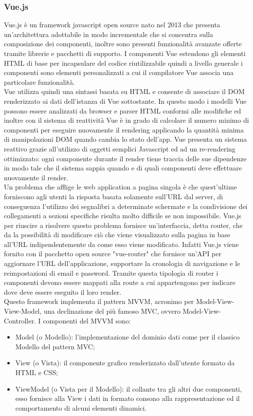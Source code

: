 \subsubsection*{Vue.js}
Vue.js è un framework javascript open source nato nel 2013 che presenta un'architettura adottabile in modo incrementale che si concentra sulla composizione dei componenti, inoltre sono presenti funzionalità avanzate offerte tramite librerie e pacchetti di supporto. I componenti Vue estendono gli elementi HTML di base per incapsulare del codice riutilizzabile quindi a livello generale i componenti sono elementi personalizzati a cui il compilatore Vue associa una particolare funzionalità.\\
Vue utilizza quindi una sintassi basata su HTML e consente di associare il DOM renderizzato ai dati dell'istanza di Vue sottostante. In questo modo i modelli Vue possono essere analizzati da browser e parser HTML conformi alle modifiche ed inoltre con il sistema di reattività Vue è in grado di calcolare il numero minimo di componenti per eseguire nuovamente il rendering applicando la quantità minima di manipolazioni DOM quando cambia lo stato dell'app. Vue presenta un sistema reattivo grazie all'utilizzo di oggetti semplici Javascript ed ad un re-rendering ottimizzato: ogni componente durante il render tiene traccia delle sue dipendenze in modo tale che il sistema sappia quando e di quali componenti deve effettuare nuovamente il render.\\
Un problema che afflige le web application a pagina singola è che quest'ultime forniscono agli utenti la risposta basata solamente sull'URL dal server, di conseguenza l'utilizzo dei segnalibri a determinate schermate e la condivisione dei collegamenti a sezioni specifiche risulta molto difficile se non impossibile. Vue.js per riuscire a risolvere questo problema fornisce un'interfaccia, detta router, che da la possibilità di modificare ciò che viene visualizzato sulla pagina in base all'URL indipendentemente da come esso viene modificato. Infatti Vue.js viene fornito con il pacchetto open source "vue-router" che fornisce un'API per aggiornare l'URL dell'applicazione, supportare la cronologia di navigazione e le reimpostazioni di email e password. Tramite questa tipologia di router i componenti devono essere mappati alla route a cui appartengono per indicare dove deve essere eseguito il loro render.\\
Questo framework implementa il pattern MVVM, acronimo per Model-View-View-Model, una declinazione del più famoso MVC, ovvero Model-View-Controller. I componenti del MVVM sono:
\begin{itemize}
	\item Model (o Modello): l'implementazione del dominio dati come per il classico Modello del pattern MVC;
	\item View (o Vista): il componente grafico renderizzato dall'utente formato da HTML e CSS;
	\item ViewModel (o Vista per il Modello): il collante tra gli altri due componenti, esso fornisce alla View i dati in formato consono alla rappresentazione ed il comportamento di alcuni elementi dinamici.
\end{itemize}

